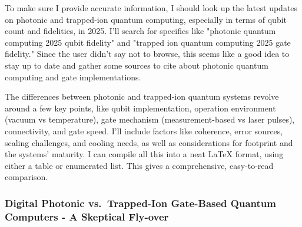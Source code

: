 \documentclass[11pt,a4paper]{article}
\begin{document}
To make sure I provide accurate information, I should look up the latest updates on photonic and trapped-ion quantum computing, especially in terms of qubit count and fidelities, in 2025. I'll search for specifics like "photonic quantum computing 2025 qubit fidelity" and "trapped ion quantum computing 2025 gate fidelity." Since the user didn't say not to browse, this seems like a good idea to stay up to date and gather some sources to cite about photonic quantum computing and gate implementations.

The differences between photonic and trapped-ion quantum systems revolve around a few key points, like qubit implementation, operation environment (vacuum vs temperature), gate mechanism (measurement-based vs laser pulses), connectivity, and gate speed. I'll include factors like coherence, error sources, scaling challenges, and cooling needs, as well as considerations for footprint and the systems' maturity. I can compile all this into a neat LaTeX format, using either a table or enumerated list. This gives a comprehensive, easy-to-read comparison.

\subsubsection{Digital Photonic vs.\ Trapped-Ion Gate-Based Quantum Computers - A Skeptical Fly-over}
\end{document}
